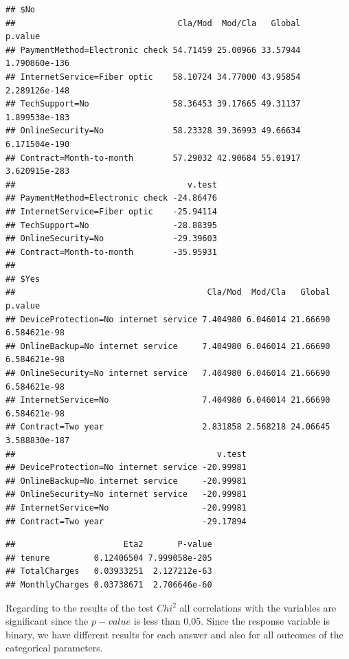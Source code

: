 \documentclass[
  twoside]{article}
\newenvironment{Shaded}{\begin{snugshade}}{\end{snugshade}}
\newcommand{\NormalTok}[1]{#1}
\newcommand{\SpecialCharTok}[1]{\textcolor[rgb]{0.00,0.00,0.00}{#1}}
\begin{document}
\begin{verbatim}
## $No
##                                 Cla/Mod  Mod/Cla   Global       p.value
## PaymentMethod=Electronic check 54.71459 25.00966 33.57944 1.790860e-136
## InternetService=Fiber optic    58.10724 34.77000 43.95854 2.289126e-148
## TechSupport=No                 58.36453 39.17665 49.31137 1.899538e-183
## OnlineSecurity=No              58.23328 39.36993 49.66634 6.171504e-190
## Contract=Month-to-month        57.29032 42.90684 55.01917 3.620915e-283
##                                   v.test
## PaymentMethod=Electronic check -24.86476
## InternetService=Fiber optic    -25.94114
## TechSupport=No                 -28.88395
## OnlineSecurity=No              -29.39603
## Contract=Month-to-month        -35.95931
## 
## $Yes
##                                       Cla/Mod  Mod/Cla   Global       p.value
## DeviceProtection=No internet service 7.404980 6.046014 21.66690  6.584621e-98
## OnlineBackup=No internet service     7.404980 6.046014 21.66690  6.584621e-98
## OnlineSecurity=No internet service   7.404980 6.046014 21.66690  6.584621e-98
## InternetService=No                   7.404980 6.046014 21.66690  6.584621e-98
## Contract=Two year                    2.831858 2.568218 24.06645 3.588830e-187
##                                         v.test
## DeviceProtection=No internet service -20.99981
## OnlineBackup=No internet service     -20.99981
## OnlineSecurity=No internet service   -20.99981
## InternetService=No                   -20.99981
## Contract=Two year                    -29.17894
\end{verbatim}

\begin{Shaded}
\end{Shaded}

\begin{verbatim}
##                      Eta2       P-value
## tenure         0.12406504 7.999058e-205
## TotalCharges   0.03933251  2.127212e-63
## MonthlyCharges 0.03738671  2.706646e-60
\end{verbatim}

Regarding to the results of the test \(Chi^2\) all correlations with the
variables are significant since the \(p-value\) is less than 0,05. Since
the response variable is binary, we have different results for each
answer and also for all outcomes of the categorical parameters.
\end{document}

